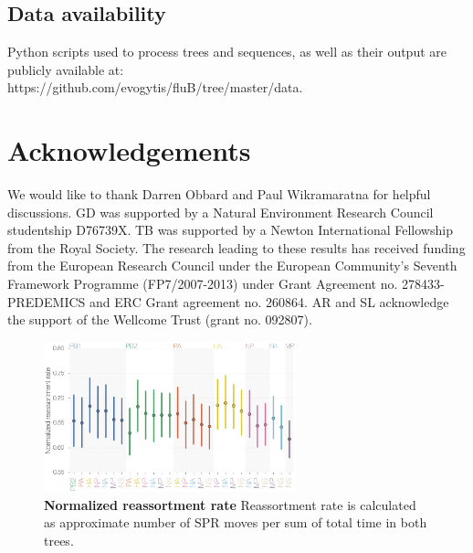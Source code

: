 \documentclass[11pt,oneside,letterpaper]{article}
\begin{document}
\subsection*{Data availability}
Python scripts used to process trees and sequences, as well as their output are publicly available at:
\\https://github.com/evogytis/fluB/tree/master/data.

\section*{Acknowledgements}
We would like to thank Darren Obbard and Paul Wikramaratna for helpful discussions.
GD was supported by a Natural Environment Research Council studentship D76739X.
TB was supported by a Newton International Fellowship from the Royal Society. 
The research leading to these results has received funding from the European Research Council under the European Community's Seventh Framework Programme (FP7/2007-2013) under Grant Agreement no. 278433-PREDEMICS and ERC Grant agreement no. 260864.
AR and SL acknowledge the support of the Wellcome Trust (grant no. 092807).




\clearpage

\setcounter{figure}{0}
\setcounter{table}{0}
\renewcommand{\thefigure}{S\arabic{figure}}
\renewcommand{\thetable}{S\arabic{table}}

\begin{figure}
\centering  
\includegraphics[width=0.65\textwidth]  {supp_figures/InfB_supp_normRErate.png}
\caption{\textbf{Normalized reassortment rate}
Reassortment rate is calculated as approximate number of SPR moves per sum of total time in both trees.}
\label{NormSPR_RErate}
\end{figure}
\end{document}
